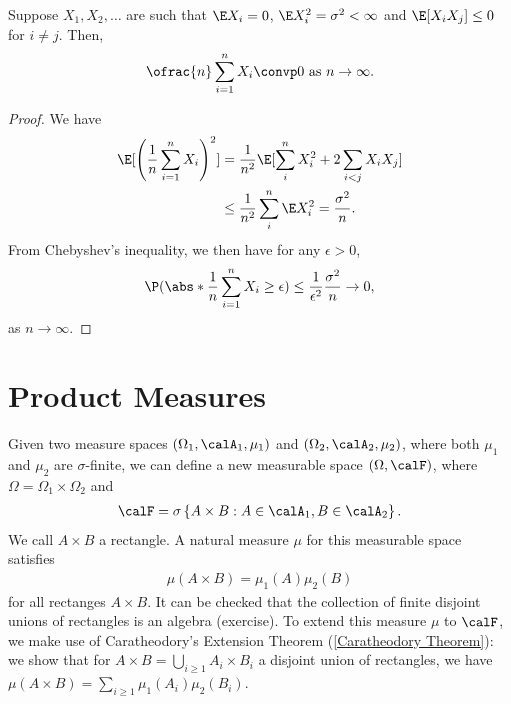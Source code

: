 \documentclass[../aipt.tex]{subfiles}
\begin{document}
\begin{Theorem}\label{wk5:Thm:WLLN}
Suppose $X_1,X_2, \ldots$ are such that $\E X_i=0$, $\E X_i^2=\sigma^2<\infty$ and $\E[X_i X_j] \leq 0$ for  $i\neq j$. Then,
\begin{align*}
\ofrac{n} \sum_{i=1}^n {X_i} \convp 0 \text{ as } n \to \infty.
\end{align*}
\end{Theorem}
\begin{proof}
We have
\begin{align*}
\E[\left(\frac{1}{n} \sum_{i=1}^n{X_i}\right)^2] 
&= \frac{1}{n^2} \E [\sum_{i}^n{X_i^2}+2\sum_{i<j}{X_i X_j}]\\
& \leq \frac{1}{n^2}  \sum_{i}^n{\E X_i^2}= \frac{\sigma^2}{n}.
\end{align*}
From Chebyshev's inequality, we then have for any $\epsilon>0$, 
\begin{align*}
\P(\abs*{\frac{1}{n} \sum_{i=1}^n{X_i}} \geq \epsilon)\leq \frac{1}{\epsilon^2}\frac{\sigma^2}{n}\to 0,
\end{align*}
as $n\to\infty$.
\end{proof}


\section{Product Measures}

Given two measure spaces $(\Omega_1, \calA_1, \mu_1)$ and $(\Omega_2, \calA_2, \mu_2)$, where both $\mu_1$and $\mu_2$ are $\sigma$-finite, we can define a new measurable space $(\Omega, \calF)$, where $\Omega=\Omega_1\times\Omega_2$ and 
\begin{align*}
\calF= \sigma\left\{A \times B: A\in \calA_1, B\in \calA_2 \right\}.
\end{align*}
We call $A\times B$ a rectangle. A natural measure $\mu$ for this measurable space satisfies 
\begin{align}\label{prod_mu}
\mu (A \times B )=\mu_1 (A) \mu_2(B)
\end{align}
for all rectanges $A\times B$. It can be checked that the collection of finite disjoint unions of rectangles is an algebra (exercise). To extend this measure $\mu$ to $\calF$, we make use of Caratheodory's Extension Theorem (\cref{Caratheodory Theorem}): we show that for $A\times B = \bigcup_{i \geq 1} {A_i \times B_i}$ a disjoint union of rectangles, we have $\mu (A \times B)= \sum_{i \geq 1} {\mu_1 (A_i) \mu_2(B_i)}$. 
\end{document}
